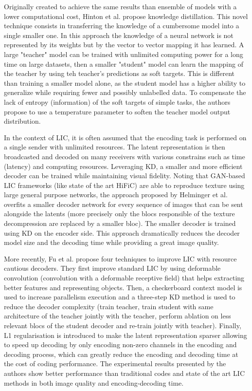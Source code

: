 Originally created to achieve the same results than ensemble of models with a lower computational cost, Hinton et al. \cite{hinton2015distillingknowledgeneuralnetwork} propose knowledge distillation. This novel technique consists in transferring the knowledge of a cumbersome model into a single smaller one. In this approach the knowledge of a neural network is not represented by its weights but by the vector to vector mapping it has learned. A large "teacher" model can be trained with unlimited computing power for a long time on large datasets, then a smaller "student" model can learn the mapping of the teacher by using teh teacher's predictions as soft targets. This is different than training a smaller model alone, as the student model has a higher ability to generalize while requiring fewer and possibly unlabelled data. To compensate the lack of entropy (information) of the soft targets of simple tasks, the authors propose to use a temperature parameter to soften the teacher model output distribution.

In the context of LIC, it is often assumed that the encoding task is performed on a single sender with unlimited resources. The latent representation is then broadcasted and decoded on many receivers with various constrains such as time (latency) and computing resources. Leveraging KD, a smaller and more efficient decoder can be trained while maintaining visual fidelity. Noting that GAN-based LIC frameworks (like state of the art HiFiC) are able to reproduce texture using large general purpose networks, the approach proposed by Helminger et al. \cite{helminger2022microdosingknowledgedistillationgan} overfits a smaller decoder network for every sequence of images that can be sent alongside the latents (more precisely only the blocs responsible of the texture decompression are replaced by a smaller bloc). The smaller decoder is trained using KD on the encoder side. This approach dramatically reduces the decoder model size and the decoding time while providing a great image quality.

More recently, Fu et al. \cite{fu2023fasthighperformancelearnedimage} propose four techniques to improve LIC with resource cautious decoders. They first improve standard LIC by using deformable convolution (convolution with a deformable receptive field) that helps extracting better features and representing objects. Then, a checkerboard context model is used to increase parallelism execution and a three-step KD method is used to reduce the decoder complexity (train teacher, train student with same architecture of the teacher jointly with the teacher, perform ablation on less relevant blocs of the student decoder and re-train jointly with teacher). Finally, L1 regularisation is introduced to make the latent representation sparser allowing to speed up decoding by only encoding non-zero channels in the encoding and decoding process, which can greatly reduce the encoding and decoding time at the cost of coding performance. The experimental results presented by the authors show better performance than traditional codes and state of the art LIC methods in both image quality and encoding-decoding time.

